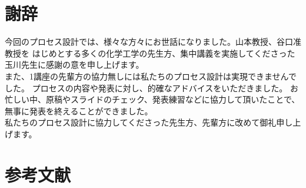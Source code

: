 \documentclass[a4j]{jsreport}
\begin{document}
\newpage
\chapter*{謝辞}
今回のプロセス設計では、様々な方々にお世話になりました。山本教授、谷口准教授を
はじめとする多くの化学工学の先生方、集中講義を実施してくださった玉川先生に感謝の意を申し上げます。\\
また、1講座の先輩方の協力無しには私たちのプロセス設計は実現できませんでした。
プロセスの内容や発表に対し、的確なアドバイスをいただきました。
お忙しい中、原稿やスライドのチェック、発表練習などに協力して頂いたことで、無事に発表を終えることができました。\\
私たちのプロセス設計に協力してくださった先生方、先輩方に改めて御礼申し上げます。

\newpage
\chapter*{参考文献}
\newpage


\newpage
\end{document}
